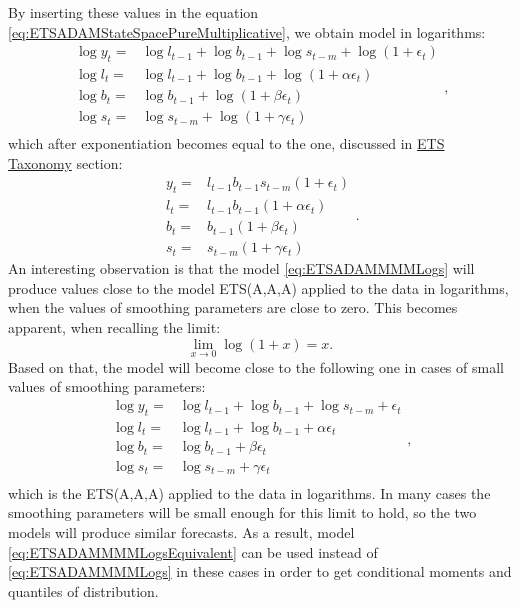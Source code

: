 \documentclass[
]{book}
\theoremstyle{definition}
\theoremstyle{definition}
\theoremstyle{definition}
\theoremstyle{definition}
\theoremstyle{remark}
\begin{document}
By inserting these values in the equation \eqref{eq:ETSADAMStateSpacePureMultiplicative}, we obtain model in logarithms:
\begin{equation}
    \begin{aligned}
        \log y_t = & \log l_{t-1} + \log b_{t-1} + \log s_{t-m} + \log \left(1 + \epsilon_{t} \right) \\
        \log l_{t} = & \log l_{t-1} + \log b_{t-1} + \log( 1  + \alpha \epsilon_{t}) \\ 
        \log b_{t} = & \log b_{t-1} + \log( 1  + \beta \epsilon_{t}) \\
        \log s_{t} = & \log s_{t-m} + \log( 1  + \gamma \epsilon_{t}) \\
    \end{aligned} ,
    \label{eq:ETSADAMMMMLogs}
\end{equation}
which after exponentiation becomes equal to the one, discussed in \protect\hyperlink{ETSTaxonomyMaths}{ETS Taxonomy} section:
\begin{equation}
  \begin{aligned}
    y_{t} = & l_{t-1} b_{t-1} s_{t-m} (1 + \epsilon_t) \\
    l_t = & l_{t-1} b_{t-1} (1 + \alpha \epsilon_t) \\
    b_t = & b_{t-1} (1 + \beta \epsilon_t) \\
    s_t = & s_{t-m} (1 + \gamma \epsilon_t) 
  \end{aligned}.
  \label{eq:ETSADAMMMM}
\end{equation}
An interesting observation is that the model \eqref{eq:ETSADAMMMMLogs} will produce values close to the model ETS(A,A,A) applied to the data in logarithms, when the values of smoothing parameters are close to zero. This becomes apparent, when recalling the limit:
\begin{equation}
  \lim\limits_{x \to 0}\log(1+x) = x .
  \label{eq:limitOf1x}
\end{equation}
Based on that, the model will become close to the following one in cases of small values of smoothing parameters:
\begin{equation}
    \begin{aligned}
        \log y_t = & \log l_{t-1} + \log b_{t-1} + \log s_{t-m} + \epsilon_{t} \\
        \log l_{t} = & \log l_{t-1} + \log b_{t-1} + \alpha \epsilon_{t} \\ 
        \log b_{t} = & \log b_{t-1} + \beta \epsilon_{t} \\
        \log s_{t} = & \log s_{t-m} + \gamma \epsilon_{t} \\
    \end{aligned} ,
    \label{eq:ETSADAMMMMLogsEquivalent}
\end{equation}
which is the ETS(A,A,A) applied to the data in logarithms. In many cases the smoothing parameters will be small enough for this limit to hold, so the two models will produce similar forecasts. As a result, model \eqref{eq:ETSADAMMMMLogsEquivalent} can be used instead of \eqref{eq:ETSADAMMMMLogs} in these cases in order to get conditional moments and quantiles of distribution.
\end{document}

